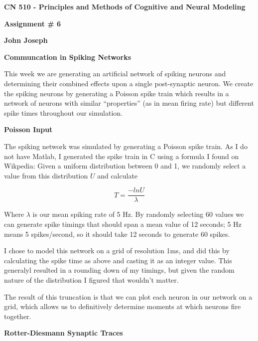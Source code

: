 \documentclass[a4paper,12pt]{article}
\begin{document}
\begin{center}

{\Large\bf CN 510 - Principles and Methods of Cognitive and Neural Modeling}

\bigskip

{\large\bf Assignment \# 6}
\smallskip

{\large\bf John Joseph}
\end{center}

\bigskip
{\bf Communcation in Spiking Networks}
\bigskip

This week we are generating an artificial network of spiking neurons and determining their combined effects upon a single post-synaptic neuron. We create the spiking neurons by generating a Poisson spike train which results in a network of neurons with similar ``properties'' (as in mean firing rate) but different spike times throughout our simulation.

\bigskip
{\bf Poisson Input}
\bigskip

The spiking network was simulated by generating a Poisson spike train. As I do not have Matlab, I generated the spike train in C using a formula I found on Wikpedia: Given a uniform distribution between 0 and 1, we randomly select a value from this distribution $U$ and calculate

\begin{equation}
T = \frac{-ln U}{\lambda}
\end{equation}

Where $\lambda$ is our mean spiking rate of 5 Hz. By randomly selecting 60 values we can generate spike timings that should span a mean value of 12 seconds; 5 Hz means 5 spikes/second, so it should take 12 seconds to generate 60 spikes. 

\vspace{2mm}

I chose to model this network on a grid of resolution 1ms, and did this by calculating the spike time as above and casting it as an integer value. This generalyl resulted in a rounding down of my timings, but given the random nature of the distribution I figured that wouldn't matter. 

\vspace{2mm}

The result of this truncation is that we can plot each neuron in our network on a grid, which allows us to definitively determine moments at which neurons fire together. 

\bigskip
{\bf Rotter-Diesmann Synaptic Traces}
\bigskip
\end{document}
